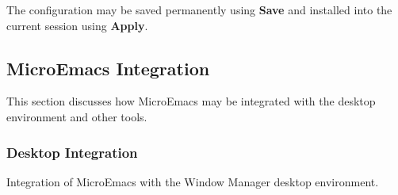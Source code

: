 \documentclass[11pt,a4paper,pdftex]{article}
\begin{document}
  The configuration may be saved permanently using \textbf{Save} and installed
  into the current session using \textbf{Apply}.

\subsection{MicroEmacs Integration}

  This section discusses how MicroEmacs may be integrated with the desktop
  environment and other tools.

\subsubsection{Desktop Integration}

  Integration of MicroEmacs with the Window Manager desktop environment.
\end{document}
